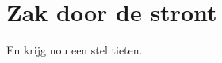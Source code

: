 \documentclass{book}
\begin{document}
\mainmatter

\chapter{Zak door de stront}
En krijg nou een stel tieten.
\end{document}
